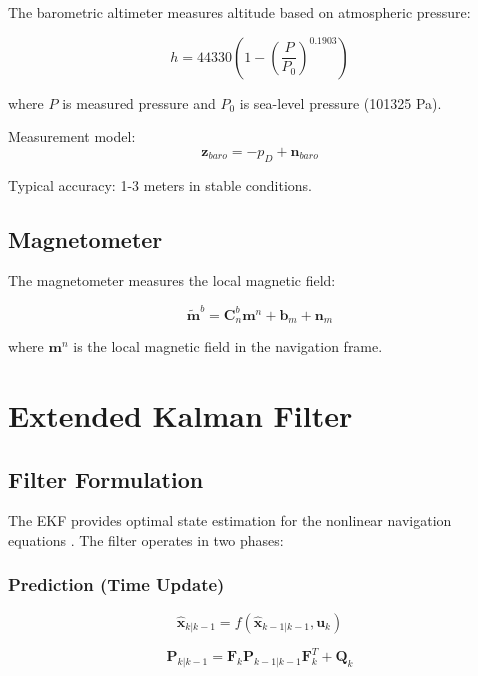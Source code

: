 \documentclass[12pt,a4paper]{article}
\begin{document}
The barometric altimeter measures altitude based on atmospheric pressure:

\begin{equation}
h = 44330 \left(1 - \left(\frac{P}{P_0}\right)^{0.1903}\right)
\end{equation}

where $P$ is measured pressure and $P_0$ is sea-level pressure (101325 Pa).

Measurement model:
\begin{equation}
\mathbf{z}_{baro} = -p_D + \mathbf{n}_{baro}
\end{equation}

Typical accuracy: 1-3 meters in stable conditions.

\subsection{Magnetometer}

The magnetometer measures the local magnetic field:

\begin{equation}
\tilde{\mathbf{m}}^b = \mathbf{C}_n^b \mathbf{m}^n + \mathbf{b}_m + \mathbf{n}_m
\end{equation}

where $\mathbf{m}^n$ is the local magnetic field in the navigation frame.

\section{Extended Kalman Filter}

\subsection{Filter Formulation}

The EKF provides optimal state estimation for the nonlinear navigation equations \cite{bar2001estimation}. The filter operates in two phases:

\subsubsection{Prediction (Time Update)}

\begin{equation}
\hat{\mathbf{x}}_{k|k-1} = f(\hat{\mathbf{x}}_{k-1|k-1}, \mathbf{u}_k)
\end{equation}

\begin{equation}
\mathbf{P}_{k|k-1} = \mathbf{F}_k \mathbf{P}_{k-1|k-1} \mathbf{F}_k^T + \mathbf{Q}_k
\end{equation}
\end{document}
